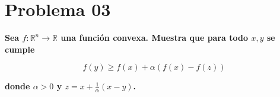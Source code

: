 \section*{Problema 03}

\textbf{Sea $f:\mathbb{R}^n \rightarrow \mathbb{R}$ una función convexa. Muestra que para todo $x,y$ se cumple}

\begin{equation*}
    f(y) \geq f(x)+\alpha (f(x)-f(z))
\end{equation*}

\textbf{donde $\alpha>0$ y $z=x+\frac{1}{\alpha}(x-y)$.}
